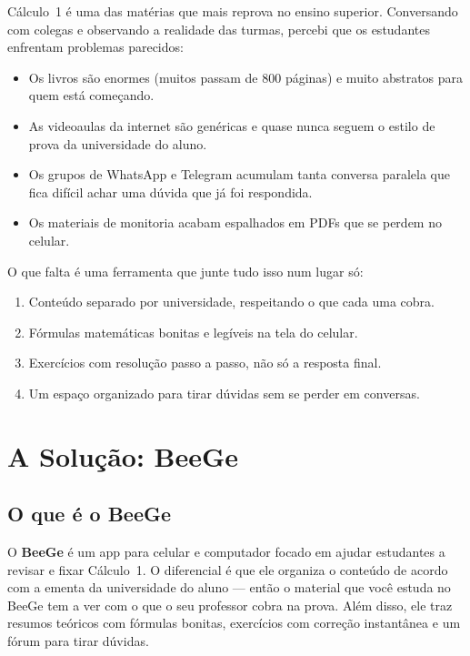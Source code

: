 \documentclass[12pt, a4paper]{article}
\begin{document}
C\'{a}lculo~1 \'{e} uma das mat\'{e}rias que mais reprova no ensino superior. Conversando com colegas e observando a realidade das turmas, percebi que os estudantes enfrentam problemas parecidos:

\begin{itemize}[leftmargin=2cm]
  \item Os livros s\~{a}o enormes (muitos passam de 800 p\'{a}ginas) e muito abstratos para quem est\'{a} come\c{c}ando.
  \item As videoaulas da internet s\~{a}o gen\'{e}ricas e quase nunca seguem o estilo de prova da universidade do aluno.
  \item Os grupos de WhatsApp e Telegram acumulam tanta conversa paralela que fica dif\'{i}cil achar uma d\'{u}vida que j\'{a} foi respondida.
  \item Os materiais de monitoria acabam espalhados em PDFs que se perdem no celular.
\end{itemize}

O que falta \'{e} uma ferramenta que junte tudo isso num lugar s\'{o}:

\begin{enumerate}[leftmargin=2cm]
  \item Conte\'{u}do separado por universidade, respeitando o que cada uma cobra.
  \item F\'{o}rmulas matem\'{a}ticas bonitas e leg\'{i}veis na tela do celular.
  \item Exerc\'{i}cios com resolu\c{c}\~{a}o passo a passo, n\~{a}o s\'{o} a resposta final.
  \item Um espa\c{c}o organizado para tirar d\'{u}vidas sem se perder em conversas.
\end{enumerate}

\section{A Solu\c{c}\~{a}o: BeeGe}

\subsection{O que \'{e} o BeeGe}

O \textbf{BeeGe} \'{e} um app para celular e computador focado em ajudar estudantes a revisar e fixar C\'{a}lculo~1. O diferencial \'{e} que ele organiza o conte\'{u}do de acordo com a ementa da universidade do aluno --- ent\~{a}o o material que voc\^{e} estuda no BeeGe tem a ver com o que o seu professor cobra na prova. Al\'{e}m disso, ele traz resumos te\'{o}ricos com f\'{o}rmulas bonitas, exerc\'{i}cios com corre\c{c}\~{a}o instant\^{a}nea e um f\'{o}rum para tirar d\'{u}vidas.
\end{document}
